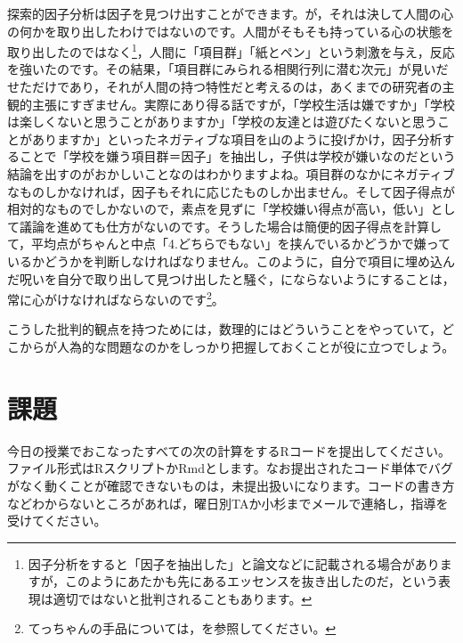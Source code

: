 \documentclass{ltjsbook}
\begin{document}
探索的因子分析は因子を見つけ出すことができます。が，それは決して人間の心の何かを取り出したわけではないのです。人間がそもそも持っている心の状態を取り出したのではなく\footnote{因子分析をすると「因子を抽出した」と論文などに記載される場合がありますが，このようにあたかも先にあるエッセンスを抜き出したのだ，という表現は適切ではないと批判されることもあります。}，人間に「項目群」「紙とペン」という刺激を与え，反応を強いたのです。その結果，「項目群にみられる相関行列に潜む次元」が見いだせただけであり，それが人間の持つ特性だと考えるのは，あくまでの研究者の主観的主張にすぎません。実際にあり得る話ですが，「学校生活は嫌ですか」「学校は楽しくないと思うことがありますか」「学校の友達とは遊びたくないと思うことがありますか」といったネガティブな項目を山のように投げかけ，因子分析することで「学校を嫌う項目群＝因子」を抽出し，子供は学校が嫌いなのだという結論を出すのがおかしいことなのはわかりますよね。項目群のなかにネガティブなものしかなければ，因子もそれに応じたものしか出ません。そして因子得点が相対的なものでしかないので，素点を見ずに「学校嫌い得点が高い，低い」として議論を進めても仕方がないのです。そうした場合は簡便的因子得点を計算して，平均点がちゃんと中点「4.どちらでもない」を挟んでいるかどうかで嫌っているかどうかを判断しなければなりません。このように，自分で項目に埋め込んだ呪いを自分で取り出して見つけ出したと騒ぐ，にならないようにすることは，常に心がけなければならないのです\footnote{てっちゃんの手品については，\textcite{kosugi2018}を参照してください。}。

こうした批判的観点を持つためには，数理的にはどういうことをやっていて，どこからが人為的な問題なのかをしっかり把握しておくことが役に立つでしょう。

\section{課題}
今日の授業でおこなったすべての次の計算をするRコードを提出してください。ファイル形式はRスクリプトかRmdとします。なお提出されたコード単体でバグがなく動くことが確認できないものは，未提出扱いになります。コードの書き方などわからないところがあれば，曜日別TAか小杉までメールで連絡し，指導を受けてください。
\end{document}
